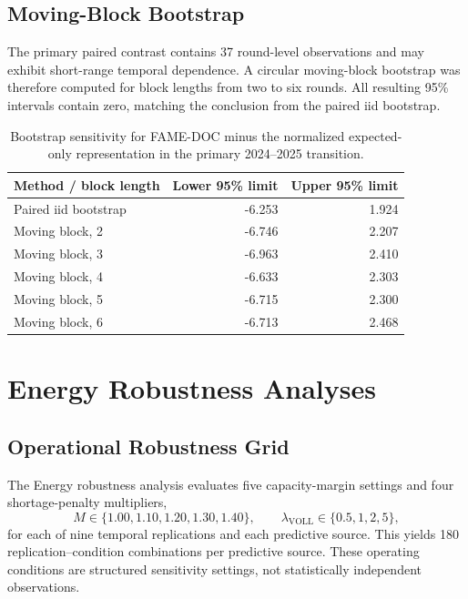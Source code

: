\documentclass[a4paper,fleqn]{cas-sc}
\begin{document}
\subsection{Moving-Block Bootstrap}
\label{sec:supp_block_bootstrap}

The primary paired contrast contains 37 round-level observations and may exhibit
short-range temporal dependence. A circular moving-block bootstrap was therefore
computed for block lengths from two to six rounds. All resulting 95\% intervals
contain zero, matching the conclusion from the paired iid bootstrap.

\begin{table}[!ht]
\centering
\caption{Bootstrap sensitivity for FAME-DOC minus the normalized expected-only
representation in the primary 2024--2025 transition.}
\label{tab:supp_mbb}
\begin{tabular}{lrr}
\toprule
Method / block length & Lower 95\% limit & Upper 95\% limit \\
\midrule
Paired iid bootstrap & -6.253 & 1.924 \\
Moving block, 2 & -6.746 & 2.207 \\
Moving block, 3 & -6.963 & 2.410 \\
Moving block, 4 & -6.633 & 2.303 \\
Moving block, 5 & -6.715 & 2.300 \\
Moving block, 6 & -6.713 & 2.468 \\
\bottomrule
\end{tabular}
\end{table}

\section{Energy Robustness Analyses}
\label{sec:supp_energy}

\subsection{Operational Robustness Grid}
\label{sec:supp_energy_grid}

The Energy robustness analysis evaluates five capacity-margin settings and four
shortage-penalty multipliers,
\[
M\in\{1.00,1.10,1.20,1.30,1.40\},
\qquad
\lambda_{\mathrm{VOLL}}\in\{0.5,1,2,5\},
\]
for each of nine temporal replications and each predictive source. This yields
180 replication--condition combinations per predictive source. These operating
conditions are structured sensitivity settings, not statistically independent
observations.
\end{document}
